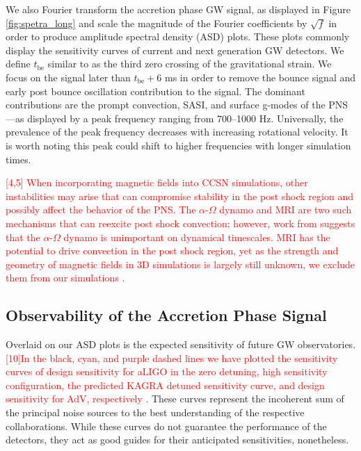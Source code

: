 \documentclass[twocolumn,times]{aastex62}  %
\begin{document}
We also Fourier transform the accretion phase GW signal, as displayed in Figure \ref{fig:spetra_long} and scale the magnitude of the Fourier coefficients by $\sqrt{f}$ in order to produce amplitude spectral density (ASD) plots.  These plots commonly display the sensitivity curves of current and next generation GW detectors.  We define $t_{\mathrm{be}}$ similar to \citet{richers:2017} as the third zero crossing of the gravitational strain.  We focus on the signal later than $t_{\mathrm{be}} + 6$ ms in order to remove the bounce signal and early post bounce oscillation contribution to the signal.  
The dominant contributions are the prompt convection, SASI, and surface g-modes of the PNS---as displayed by a peak frequency ranging from 700--1000 Hz.  Universally, the prevalence of the peak frequency decreases with increasing rotational velocity.  It is worth noting this peak could shift to higher frequencies with longer simulation times.

\textcolor{red}{[4,5] When incorporating magnetic fields into CCSN simulations, other instabilities may arise that can compromise stability in the post shock region and possibly affect the behavior of the PNS.  The $\alpha$-$\Omega$ dynamo and MRI are two such mechanisms that can reexcite post shock convection; however, work from \citet{bonanno:2005} suggests that the $\alpha$-$\Omega$ dynamo is unimportant on dynamical timescales.   MRI has the potential to drive convection in the post shock region, yet as the strength and geometry of magnetic fields in 3D simulations is largely still unknown, we exclude them from our simulations \citep{cerda-duran:2007}.  }

\subsection{Observability of the Accretion Phase Signal}

Overlaid on our ASD plots is the expected sensitivity of future GW observatories.  
\textcolor{red}{[10]In the black, cyan, and purple dashed lines we have plotted the sensitivity curves of design sensitivity for aLIGO in the zero detuning, high sensitivity configuration, the predicted KAGRA detuned sensitivity curve, and design sensitivity for AdV, respectively \citep{komari:2017,barsotti:2018,abbott:2018}.}
These curves represent the incoherent sum of the principal noise sources to the best understanding of the respective collaborations.  While these curves do not guarantee the performance of the detectors, they act as good guides for their anticipated sensitivities, nonetheless. 
\end{document}
